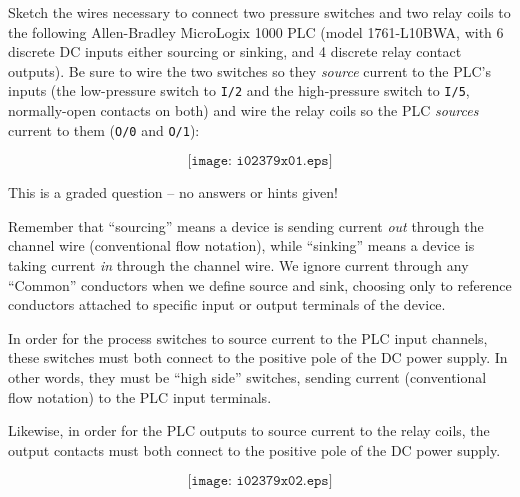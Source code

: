 

Sketch the wires necessary to connect two pressure switches and two relay coils to the following Allen-Bradley MicroLogix 1000 PLC (model 1761-L10BWA, with 6 discrete DC inputs either sourcing or sinking, and 4 discrete relay contact outputs).  Be sure to wire the two switches so they {\it source} current to the PLC's inputs (the low-pressure switch to {\tt I/2} and the high-pressure switch to {\tt I/5}, normally-open contacts on both) and wire the relay coils so the PLC {\it sources} current to them ({\tt O/0} and {\tt O/1}):

\vskip 50pt

$$\texttt{[image: i02379x01.eps]}$$

\vfil

\eject






This is a graded question -- no answers or hints given!







Remember that ``sourcing'' means a device is sending current {\it out} through the channel wire (conventional flow notation), while ``sinking'' means a device is taking current {\it in} through the channel wire.  We ignore current through any ``Common'' conductors when we define source and sink, choosing only to reference conductors attached to specific input or output terminals of the device.

\vskip 10pt

In order for the process switches to source current to the PLC input channels, these switches must both connect to the positive pole of the DC power supply.  In other words, they must be ``high side'' switches, sending current (conventional flow notation) to the PLC input terminals.

\vskip 10pt

Likewise, in order for the PLC outputs to source current to the relay coils, the output contacts must both connect to the positive pole of the DC power supply.

$$\texttt{[image: i02379x02.eps]}$$





